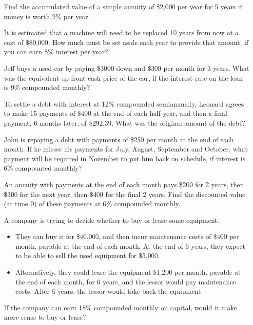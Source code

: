 \documentclass[12pt]{exam}
\begin{document}
\vspace{2in}  %

\begin{questions}

    \question Find the accumulated value of a simple annuity of \$2,000 per year for 5 years
    if money is worth 9\% per year.
    \vspace{1.25in}

    \question It is estimated that a machine will need to be replaced 10 years from now at a cost of \$80,000.  How
    much must be set aside each year to provide that amount, if you can earn 8\% interest per year?
    \vspace{1.5in}

    \question Jeff buys a used car by paying \$3000 down and \$300 per month for 3 years.  What was the
    equivalent up-front cash price of the car, if the interest rate on the loan is 9\% compounded monthly?
    \vspace{2in}

    \question To settle a debt with interest at 12\% compounded semiannually, Leonard agrees to make 15
    payments of \$400 at the end of each half-year, and then a final payment, 6 months later, of \$292.39.
    What was the original amount of the debt?
    \vspace{2in}

    \question John is repaying a debt with payments of \$250 per month at the end of each month.  If he misses his
    payments for July, August, September and October, what payment will be required in November to put him back on
    schedule, if interest is 6\% compounted monthly?
    \vspace{2in}

    \question An annuity with payments at the end of each month pays \$200 for 2 years, then \$300 for the next year, then
    \$400 for the final 2 years.  Find the discounted value (at time 0) of these payments at 6\% compounded monthly.
    \vspace{1.5in}

    \question A company is trying to decide whether to buy or lease some equipment.
    \begin{itemize}
        \item They can buy it for \$40,000, and then incur maintenance costs of \$400 per month, payable at the end of each
              month.  At the end of 6 years, they expect to be able to sell the used equipment for \$5,000.
        \item Alternatively, they could lease the equipment \$1,200 per month, payable at the end of each month, for
              6 years, and the lessor would pay maintenance costs.  After 6 years, the lessor would take back the equipment
    \end{itemize}
    If the company can earn 18\% compounded monthly on capital, would it make more sense to buy or lease?
    \vspace{1.5in}

\end{questions}
\end{document}
